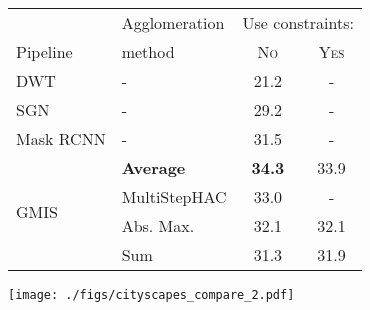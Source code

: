 \begin{figure}[t]
\centering
\begin{minipage}[T]{0.59\textwidth}
    \centering
    \footnotesize
        \begin{tabular}{l|l|cc}
           & Agglomeration  &  \multicolumn{2}{c}{Use constraints:} \\
          Pipeline & method & \textsc{No} & \textsc{Yes} \\ \midrule
DWT \cite{bai2017deep} & - & 21.2 & - \\
SGN \cite{liu2017sgn} & - & 29.2 & - \\
Mask RCNN \cite{he2017mask} & - & 31.5 & - \\ \hline
 & \textbf{\algname{} Average}& \textbf{34.3}  & 33.9  \\
\multirow{2}{*}{GMIS \cite{liu2018affinity}} & MultiStepHAC \cite{liu2018affinity} & 33.0 & -  \\
 & \algname{} Abs. Max. \cite{wolf2018mutex}  & 32.1 & 32.1 \\
 & \algname{} Sum \cite{keuper2015efficient,levinkov2017comparative} & 31.3  & 31.9  \\
        \end{tabular}
    \label{tab:results_cityscapes_val}
\end{minipage}\hfill
\begin{minipage}[T]{0.37\textwidth}
    \centering
\texttt{[image: ./figs/cityscapes\_compare\_2.pdf]} %
\end{minipage}
\end{figure}
